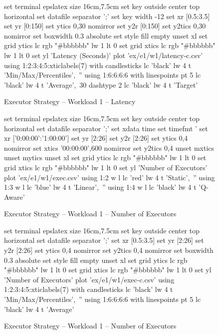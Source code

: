 \begin{figure}[!htbp]
	\centering
	\begin{minipage}[h]{\linewidth}
		\centering
		\begin{gnuplot}[terminal=epslatex, terminaloptions=color colortext]
			set terminal epslatex size 16cm,7.5cm
			set key outside center top horizontal
			set datafile separator ';'
            set key width -12
			set xr [0.5:3.5]
			set yr [0:150]
			set ytics 0,30 nomirror
			set y2r [0:150]
			set y2tics 0,30 nomirror
			set boxwidth 0.3 absolute
			set style fill empty
			unset xl
            set grid ytics lc rgb "#bbbbbb" lw 1 lt 0
            set grid xtics lc rgb "#bbbbbb" lw 1 lt 0
			set yl 'Latency (Seconds)'
			plot 'ex/e1/w1/latency-c.csv' using 1:2:3:4:5:xticlabels(7) with candlesticks lc 'black' lw 4 t 'Min/Max/Percentiles',\
			'' using 1:6:6:6:6 with linespoints pt 5 lc 'black' lw 4 t 'Average',\
            30 dashtype 2 lc 'black' lw 4 t 'Target'
		\end{gnuplot}
		\caption{Executor Strategy -- Workload 1 -- Latency}
		\label{eval:f:e1:w1:lat-c}
	\end{minipage}\hfil
	\begin{minipage}[h]{\linewidth}
		\centering
		\begin{gnuplot}[terminal=epslatex, terminaloptions=color colortext]
			set terminal epslatex size 16cm,7.5cm
			set key outside center top horizontal
			set datafile separator ';'
			set xdata time
			set timefmt '%
			set xr ['0:00:00':'1:00:00']
			set yr [2:26]
			set y2r [2:26]
			set ytics 0,4 nomirror
			set xtics '00:00:00',600 nomirror
			set y2tics 0,4
			unset mxtics
			unset mytics
			unset xl
            set grid ytics lc rgb "#bbbbbb" lw 1 lt 0
            set grid xtics lc rgb "#bbbbbb" lw 1 lt 0
			set yl 'Number of Executors'
			plot 'ex/e1/w1/exec.csv' using 1:2 w l lc 'red' lw 4 t 'Static',\
			'' using 1:3 w l lc 'blue' lw 4 t 'Linear',\
			'' using 1:4 w l lc 'black' lw 4 t 'Q-Aware'
		\end{gnuplot}
		\caption{Executor Strategy -- Workload 1 -- Number of Executors}
		\label{eval:f:e1:w1:exec}
	\end{minipage}\hfil
	\begin{minipage}[h]{\linewidth}
		\centering
		\begin{gnuplot}[terminal=epslatex, terminaloptions=color colortext]
			set terminal epslatex size 16cm,7.5cm
			set key outside center top horizontal
			set datafile separator ';'
			set xr [0.5:3.5]
			set yr [2:26]
			set y2r [2:26]
			set ytics 0,4 nomirror
			set y2tics 0,4 nomirror
			set boxwidth 0.3 absolute
			set style fill empty
			unset xl
            set grid ytics lc rgb "#bbbbbb" lw 1 lt 0
            set grid xtics lc rgb "#bbbbbb" lw 1 lt 0
			set yl 'Number of Executors'
			plot 'ex/e1/w1/exec-c.csv' using 1:2:3:4:5:xticlabels(7) with candlesticks lc 'black' lw 4 t 'Min/Max/Percentiles',\
			'' using 1:6:6:6:6 with linespoints pt 5 lc 'black' lw 4 t 'Average' 
		\end{gnuplot}
		\caption{Executor Strategy -- Workload 1 -- Number of Executors}
		\label{eval:f:e1:w1:exec-c}
	\end{minipage}
\end{figure}
